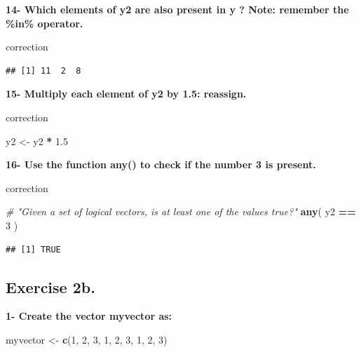 \documentclass[]{book}
\newenvironment{Shaded}{\begin{snugshade}}{\end{snugshade}}
\newcommand{\CommentTok}[1]{\textcolor[rgb]{0.56,0.35,0.01}{\textit{#1}}}
\newcommand{\DecValTok}[1]{\textcolor[rgb]{0.00,0.00,0.81}{#1}}
\newcommand{\FloatTok}[1]{\textcolor[rgb]{0.00,0.00,0.81}{#1}}
\newcommand{\KeywordTok}[1]{\textcolor[rgb]{0.13,0.29,0.53}{\textbf{#1}}}
\newcommand{\NormalTok}[1]{#1}
\newcommand{\OperatorTok}[1]{\textcolor[rgb]{0.81,0.36,0.00}{\textbf{#1}}}
\newcommand{\StringTok}[1]{\textcolor[rgb]{0.31,0.60,0.02}{#1}}
\begin{document}
\textbf{14- Which elements of y2 are also present in y ?
Note: remember the \%in\% operator.}

correction

\begin{Shaded}
\end{Shaded}

\begin{verbatim}
## [1] 11  2  8
\end{verbatim}

\textbf{15- Multiply each element of y2 by 1.5: reassign.}

correction

\begin{Shaded}
\begin{Highlighting}[]
\NormalTok{y2 <-}\StringTok{ }\NormalTok{y2 }\OperatorTok{*}\StringTok{ }\FloatTok{1.5}
\end{Highlighting}
\end{Shaded}

\textbf{16- Use the function any() to check if the number 3 is present.}

correction

\begin{Shaded}
\begin{Highlighting}[]
\CommentTok{# "Given a set of logical vectors, is at least one of the values true?"}
\KeywordTok{any}\NormalTok{( y2 }\OperatorTok{==}\StringTok{ }\DecValTok{3}\NormalTok{ )}
\end{Highlighting}
\end{Shaded}

\begin{verbatim}
## [1] TRUE
\end{verbatim}

\hypertarget{exercise-2b.}{%
\subsection{Exercise 2b.}\label{exercise-2b.}}

\textbf{1- Create the vector myvector as:}

\begin{Shaded}
\begin{Highlighting}[]
\NormalTok{myvector <-}\StringTok{ }\KeywordTok{c}\NormalTok{(}\DecValTok{1}\NormalTok{, }\DecValTok{2}\NormalTok{, }\DecValTok{3}\NormalTok{, }\DecValTok{1}\NormalTok{, }\DecValTok{2}\NormalTok{, }\DecValTok{3}\NormalTok{, }\DecValTok{1}\NormalTok{, }\DecValTok{2}\NormalTok{, }\DecValTok{3}\NormalTok{)}
\end{Highlighting}
\end{Shaded}
\end{document}
